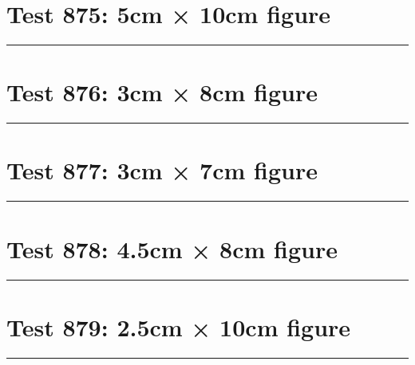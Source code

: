 \documentclass[a4paper,11pt]{article}
\begin{document}
\section*{Test 875: 5cm × 10cm figure}
\begin{swarmwrap}%
  \begin{minipage}[t]{5cm}
    \centering
    \rule{\linewidth}{10cm}
  \end{minipage}%
\end{swarmwrap}%
\swarmwrapnext
\lipsum[20]
\lipsum[21]
\lipsum[22]
\lipsum[23]
\lipsum[24]
\section*{Test 876: 3cm × 8cm figure}
\begin{swarmwrap}%
  \begin{minipage}[t]{3cm}
    \centering
    \rule{\linewidth}{8cm}
  \end{minipage}%
\end{swarmwrap}%
\swarmwrapnext
\lipsum[88]
\lipsum[89]
\lipsum[90]
\section*{Test 877: 3cm × 7cm figure}
\begin{swarmwrap}%
  \begin{minipage}[t]{3cm}
    \centering
    \rule{\linewidth}{7cm}
  \end{minipage}%
\end{swarmwrap}%
\swarmwrapnext
\lipsum[42]
\lipsum[43]
\lipsum[44]
\lipsum[45]
\section*{Test 878: 4.5cm × 8cm figure}
\begin{swarmwrap}%
  \begin{minipage}[t]{4cm}
    \centering
    \rule{\linewidth}{8cm}
  \end{minipage}%
\end{swarmwrap}%
\swarmwrapnext
\lipsum[83]
\lipsum[84]
\lipsum[85]
\lipsum[86]
\lipsum[87]
\lipsum[88]
\section*{Test 879: 2.5cm × 10cm figure}
\begin{swarmwrap}%
  \begin{minipage}[t]{2cm}
    \centering
    \rule{\linewidth}{10cm}
  \end{minipage}%
\end{swarmwrap}%
\swarmwrapnext
\lipsum[59]
\lipsum[60]
\lipsum[61]
\lipsum[62]
\lipsum[63]
\end{document}
